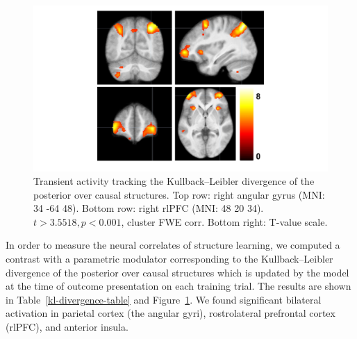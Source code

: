 \documentclass[10pt,letterpaper]{article}
\begin{document}
\begin{figure}[ht]
\begin{center}
\includegraphics[scale=0.5,  trim = 130 50 0 0]{kl-divergence.pdf}
\end{center}
\caption{Transient activity tracking the Kullback--Leibler divergence of the posterior over causal structures. Top row: right angular gyrus (MNI: 34 -64 48). Bottom row: right rlPFC (MNI: 48 20 34). $t > 3.5518, p < 0.001$, cluster FWE corr. Bottom right: T-value scale.} 
\label{kl-divergence-img}
\end{figure}

In order to measure the neural correlates of structure learning, we computed a contrast with a parametric modulator corresponding to the Kullback--Leibler divergence of the posterior over causal structures which is updated by the model at the time of outcome presentation on each training trial. The results are shown in Table~\ref{kl-divergence-table} and Figure~\ref{kl-divergence-img}. We found significant bilateral activation in parietal cortex (the angular gyri), rostrolateral prefrontal cortex (rlPFC), and anterior insula.
\end{document}
